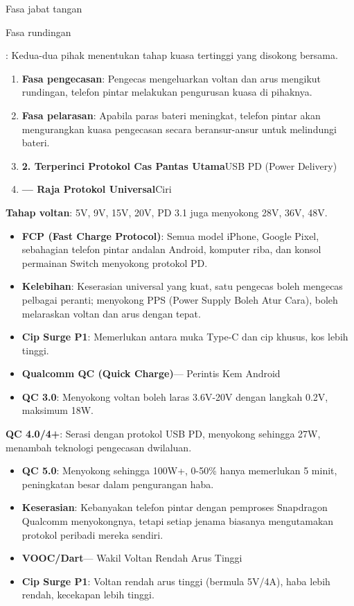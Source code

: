 
Fasa jabat tangan


Fasa rundingan

: Kedua-dua pihak menentukan tahap kuasa tertinggi yang disokong bersama.

\begin{enumerate}
  \item \textbf{Fasa pengecasan}: Pengecas mengeluarkan voltan dan arus mengikut rundingan, telefon pintar melakukan pengurusan kuasa di pihaknya.
  \item \textbf{Fasa pelarasan}: Apabila paras bateri meningkat, telefon pintar akan mengurangkan kuasa pengecasan secara beransur-ansur untuk melindungi bateri.
  \item \textbf{2. Terperinci Protokol Cas Pantas Utama}USB PD (Power Delivery)
  \item \textbf{— Raja Protokol Universal}Ciri
\end{enumerate}


\textbf{Tahap voltan}: 5V, 9V, 15V, 20V, PD 3.1 juga menyokong 28V, 36V, 48V.

\begin{itemize}
  \item \textbf{FCP (Fast Charge Protocol)}: Semua model iPhone, Google Pixel, sebahagian telefon pintar andalan Android, komputer riba, dan konsol permainan Switch menyokong protokol PD.
  \item \textbf{Kelebihan}: Keserasian universal yang kuat, satu pengecas boleh mengecas pelbagai peranti; menyokong PPS (Power Supply Boleh Atur Cara), boleh melaraskan voltan dan arus dengan tepat.
  \item \textbf{Cip Surge P1}: Memerlukan antara muka Type-C dan cip khusus, kos lebih tinggi.
  \item \textbf{Qualcomm QC (Quick Charge)}— Perintis Kem Android
  \item \textbf{QC 3.0}: Menyokong voltan boleh laras 3.6V-20V dengan langkah 0.2V, maksimum 18W.
\end{itemize}

\textbf{QC 4.0/4+}: Serasi dengan protokol USB PD, menyokong sehingga 27W, menambah teknologi pengecasan dwilaluan.

\begin{itemize}
  \item \textbf{QC 5.0}: Menyokong sehingga 100W+, 0-50\% hanya memerlukan 5 minit, peningkatan besar dalam pengurangan haba.
  \item \textbf{Keserasian}: Kebanyakan telefon pintar dengan pemproses Snapdragon Qualcomm menyokongnya, tetapi setiap jenama biasanya mengutamakan protokol peribadi mereka sendiri.
  \item \textbf{VOOC/Dart}— Wakil Voltan Rendah Arus Tinggi
  \item \textbf{Cip Surge P1}: Voltan rendah arus tinggi (bermula 5V/4A), haba lebih rendah, kecekapan lebih tinggi.
\end{itemize}

